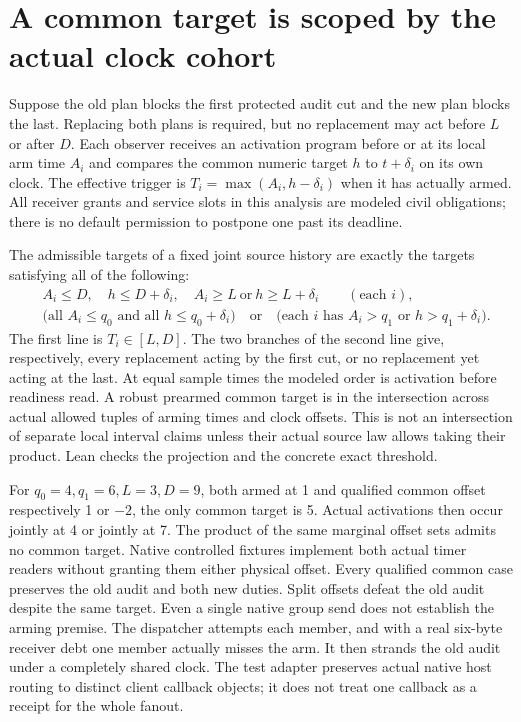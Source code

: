 \documentclass{article}
\begin{document}
\section*{A common target is scoped by the actual clock cohort}
Suppose the old plan blocks the first protected audit cut and
the new plan blocks the last. Replacing both plans is required,
but no replacement may act before \(L\) or after \(D\). Each
observer receives an activation program before or at its local
arm time \(A_i\) and compares the common numeric target \(h\)
to \(t+\delta_i\) on its own clock. The effective trigger is
\(T_i=\max(A_i,h-\delta_i)\) when it has actually armed. All
receiver grants and service slots in this analysis are modeled
civil obligations; there is no default permission to postpone
one past its deadline.

The admissible targets of a fixed joint source history are
exactly the targets satisfying all of the following:
\[
\begin{split}
 & A_i\le D,\quad h\le D+\delta_i,\quad
          A_i\ge L\ \text{or}\ h\ge L+\delta_i\qquad(\text{each }i),\\
 &\bigl(\text{all }A_i\le q_0\text{ and all }h\le q_0+\delta_i\bigr)
 \quad\text{or}\quad
 \bigl(\text{each }i\text{ has }A_i>q_1\text{ or }h>q_1+\delta_i\bigr).
\end{split}
\]
The first line is \(T_i\in[L,D]\). The two branches of the second
line give, respectively, every replacement acting by the first cut,
or no replacement yet acting at the last. At equal sample times
the modeled order is activation before readiness read. A robust
prearmed common target is in the intersection across actual
allowed tuples of arming times and clock offsets. This is not an
intersection of separate local interval claims unless their
actual source law allows taking their product. Lean checks the
projection and the concrete exact threshold.

For \(q_0=4,q_1=6,L=3,D=9\), both armed at 1 and qualified common
offset respectively 1 or \(-2\), the only common target is 5.
Actual activations then occur jointly at 4 or jointly at 7.
The product of the same marginal offset sets admits no common
target. Native controlled fixtures implement both actual timer
readers without granting them either physical offset. Every
qualified common case preserves the old audit and both new duties.
Split offsets defeat the old audit despite the same target.
Even a single native group send does not establish the arming
premise. The dispatcher attempts each member, and with a real
six-byte receiver debt one member actually misses the arm.
It then strands the old audit under a completely shared clock.
The test adapter preserves actual native host routing to distinct
client callback objects; it does not treat one callback as a
receipt for the whole fanout.
\end{document}
